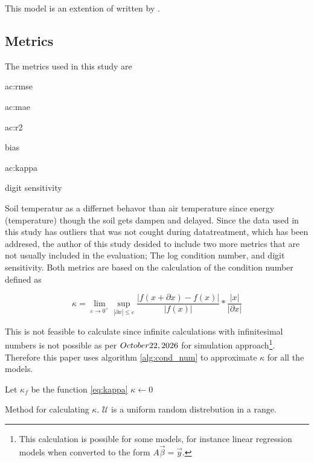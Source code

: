 This model is an extention of \cite{li_modeling_2020} written by \citeauthor{li_modeling_2020}. 

\subsection{Metrics}\label{sec:method:metric}

The metrics used in this study are

\begin{itemize*}
	\item \acrfull{ac:rmse}
	\item \acrfull{ac:mae}
	\item \acrfull{ac:r2}
	\item bias
	\item \acrfull{ac:kappa}
	\item digit sensitivity
\end{itemize*}

Soil temperatur as a differnet behavor than air temperature since energy (temperature) though the soil gets dampen and delayed. Since the data used in this study has outliers that was not cought during datatreatment, which has been addresed, the author of this study desided to include two more metrics that are not usually included in the evaluation; The log condition number, and digit sensitivity. Both metrics are based on the calculation of the condition number defined as 

\begin{equation}\label{eq:kappa}
\kappa = \lim\limits_{\varepsilon \to 0^+} \sup\limits_{|\partial x|\leq\varepsilon}  \frac{\left|f(x+\partial x) - f(x)\right|}{|f(x)|}*\frac{|x|}{|\partial x|} 
\end{equation}

This is not feasible to calculate since infinite calculations with infinitesimal numbers is not possible as per $\today$ for simulation approach\footnote{This calculation is possible for some models, for instance linear regression models when converted to the form $A\vec{\beta} = \vec{y}$.}. Therefore this paper uses algorithm \ref{alg:cond_num} to approximate $\kappa$ for all the models.

\begin{algorithm}[H]
	\SetAlgoLined
	Let $\kappa_f$ be the function \ref{eq:kappa}\;
	$\kappa\gets 0$\;
	\Return{$\kappa$}
	\caption[Randommised $\kappa$ algorithm]{Method for calculating $\kappa$. $\mathcal{U}$ is a uniform random distrebution in a range.}
	\label{alg:cond_num}
\end{algorithm}


